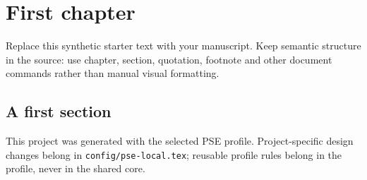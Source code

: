 \chapter{First chapter}

Replace this synthetic starter text with your manuscript. Keep semantic structure in the source: use chapter, section, quotation, footnote and other document commands rather than manual visual formatting.

\section{A first section}

This project was generated with the selected PSE profile. Project-specific design changes belong in \texttt{config/pse-local.tex}; reusable profile rules belong in the profile, never in the shared core.
